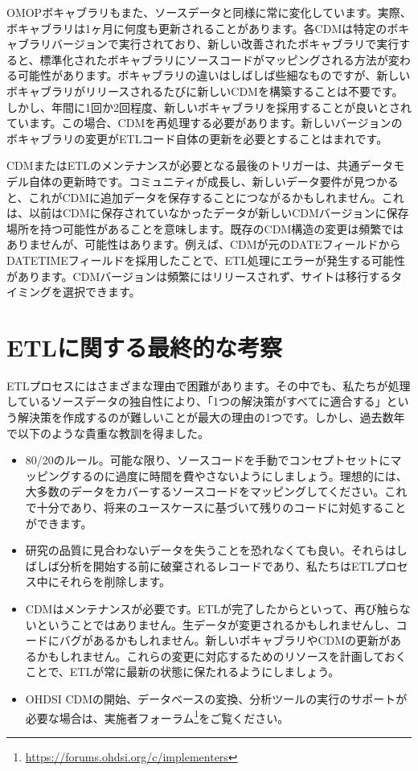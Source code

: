 \documentclass[
  11pt]{book}
\providecommand{\tightlist}{%
  \setlength{\itemsep}{0pt}\setlength{\parskip}{0pt}}
\theoremstyle{definition}
\theoremstyle{definition}
\theoremstyle{definition}
\theoremstyle{definition}
\theoremstyle{remark}
\begin{document}
OMOPボキャブラリもまた、ソースデータと同様に常に変化しています。実際、ボキャブラリは1ヶ月に何度も更新されることがあります。各CDMは特定のボキャブラリバージョンで実行されており、新しい改善されたボキャブラリで実行すると、標準化されたボキャブラリにソースコードがマッピングされる方法が変わる可能性があります。ボキャブラリの違いはしばしば些細なものですが、新しいボキャブラリがリリースされるたびに新しいCDMを構築することは不要です。しかし、年間に1回か2回程度、新しいボキャブラリを採用することが良いとされています。この場合、CDMを再処理する必要があります。新しいバージョンのボキャブラリの変更がETLコード自体の更新を必要とすることはまれです。

CDMまたはETLのメンテナンスが必要となる最後のトリガーは、共通データモデル自体の更新時です。コミュニティが成長し、新しいデータ要件が見つかると、これがCDMに追加データを保存することにつながるかもしれません。これは、以前はCDMに保存されていなかったデータが新しいCDMバージョンに保存場所を持つ可能性があることを意味します。既存のCDM構造の変更は頻繁ではありませんが、可能性はあります。例えば、CDMが元のDATEフィールドからDATETIMEフィールドを採用したことで、ETL処理にエラーが発生する可能性があります。CDMバージョンは頻繁にはリリースされず、サイトは移行するタイミングを選択できます。

\section{ETLに関する最終的な考察}\label{etlux306bux95a2ux3059ux308bux6700ux7d42ux7684ux306aux8003ux5bdf}

ETLプロセスにはさまざまな理由で困難があります。その中でも、私たちが処理しているソースデータの独自性により、「1つの解決策がすべてに適合する」という解決策を作成するのが難しいことが最大の理由の1つです。しかし、過去数年で以下のような貴重な教訓を得ました。

\begin{itemize}
\tightlist
\item
  80/20のルール。可能な限り、ソースコードを手動でコンセプトセットにマッピングするのに過度に時間を費やさないようにしましょう。理想的には、大多数のデータをカバーするソースコードをマッピングしてください。これで十分であり、将来のユースケースに基づいて残りのコードに対処することができます。
\item
  研究の品質に見合わないデータを失うことを恐れなくても良い。それらはしばしば分析を開始する前に破棄されるレコードであり、私たちはETLプロセス中にそれらを削除します。
\item
  CDMはメンテナンスが必要です。ETLが完了したからといって、再び触らないということではありません。生データが変更されるかもしれませんし、コードにバグがあるかもしれません。新しいボキャブラリやCDMの更新があるかもしれません。これらの変更に対応するためのリソースを計画しておくことで、ETLが常に最新の状態に保たれるようにしましょう。
\item
  OHDSI CDMの開始、データベースの変換、分析ツールの実行のサポートが必要な場合は、実施者フォーラム\footnote{\url{https://forums.ohdsi.org/c/implementers}}をご覧ください。
\end{itemize}
\end{document}
